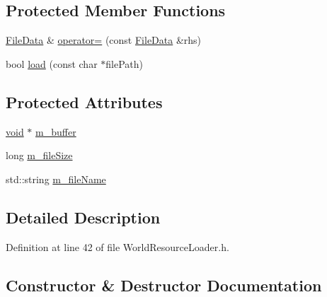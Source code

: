 \subsection*{Protected Member Functions}
\begin{DoxyCompactItemize}
\item 
\mbox{\hyperlink{structnjli_1_1_world_resource_loader_1_1_file_data}{File\+Data}} \& \mbox{\hyperlink{structnjli_1_1_world_resource_loader_1_1_file_data_a37db22a2139681863261e3ab023285dd}{operator=}} (const \mbox{\hyperlink{structnjli_1_1_world_resource_loader_1_1_file_data}{File\+Data}} \&rhs)
\item 
bool \mbox{\hyperlink{structnjli_1_1_world_resource_loader_1_1_file_data_a1b96bd34bbe2b7b9d63c951aefd1c2e4}{load}} (const char $\ast$file\+Path)
\end{DoxyCompactItemize}
\subsection*{Protected Attributes}
\begin{DoxyCompactItemize}
\item 
\mbox{\hyperlink{_thread_8h_af1e856da2e658414cb2456cb6f7ebc66}{void}} $\ast$ \mbox{\hyperlink{structnjli_1_1_world_resource_loader_1_1_file_data_a14834fda30c9666e526bea54520a65b5}{m\+\_\+buffer}}
\item 
long \mbox{\hyperlink{structnjli_1_1_world_resource_loader_1_1_file_data_a83ed2ee2dcd559a58c02c7f63b8821ad}{m\+\_\+file\+Size}}
\item 
std\+::string \mbox{\hyperlink{structnjli_1_1_world_resource_loader_1_1_file_data_a3bfb51955988b80ee0b3e6bd6ac9596b}{m\+\_\+file\+Name}}
\end{DoxyCompactItemize}


\subsection{Detailed Description}


Definition at line 42 of file World\+Resource\+Loader.\+h.



\subsection{Constructor \& Destructor Documentation}
\mbox{\label{structnjli_1_1_world_resource_loader_1_1_file_data_a0f3b18bc1de226c8554a86c1916713fc}} 
